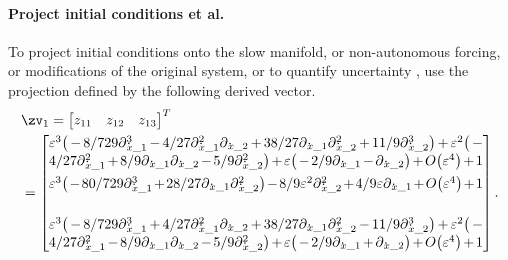 \paragraph{Project initial conditions et al.}
To project initial conditions
onto the slow manifold, or non-autonomous
forcing, or modifications of the original system, or to quantify uncertainty \cite[Ch.12]{Roberts89b, Roberts97b, Roberts2014a}, use the projection defined by the following derived vector.
\begin{align*}&
\zv_1=\begin{bmatrix}z_{11}&z_{12}&z_{13}\end{bmatrix}^T
\\&
=\begin{bmatrix}
\ParMath{ \eps^{3} \big(-8/729 \diff_{x\_1}^{3}-4/27 \diff_{x\_1}^{2} \diff
_{x\_2}+38/27 \diff_{x\_1} \diff_{x\_2}^{2}+11/9 \diff_{x\_2}^{3}\big)+
\eps^{2} \big(-4/27 \diff_{x\_1}^{2}+8/9 \diff_{x\_1} \diff_{x\_2}-5/9 
\diff_{x\_2}^{2}\big)+\eps \big(-2/9 \diff_{x\_1}-\diff_{x\_2}\big)+O
\big(\varepsilon ^{4}\big)+1
}\\[4ex]
\ParMath{ \eps^{3} \big(-80/729 \diff_{x\_1}^{3}+28/27 \diff_{x\_1} \diff_{
x\_2}^{2}\big)-8/9 \eps^{2} \diff_{x\_2}^{2}+4/9 \eps \diff_{x\_1}+O
\big(\varepsilon ^{4}\big)+1
}\\[4ex]
\ParMath{ \eps^{3} \big(-8/729 \diff_{x\_1}^{3}+4/27 \diff_{x\_1}^{2} \diff
_{x\_2}+38/27 \diff_{x\_1} \diff_{x\_2}^{2}-11/9 \diff_{x\_2}^{3}\big)+
\eps^{2} \big(-4/27 \diff_{x\_1}^{2}-8/9 \diff_{x\_1} \diff_{x\_2}-5/9 
\diff_{x\_2}^{2}\big)+\eps \big(-2/9 \diff_{x\_1}+\diff_{x\_2}\big)+O
\big(\varepsilon ^{4}\big)+1
}
\end{bmatrix}.
\end{align*}

